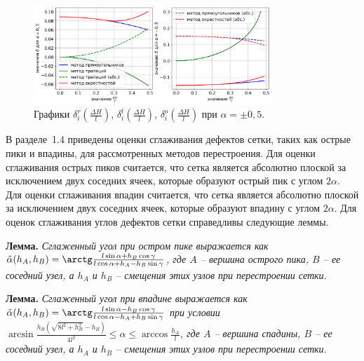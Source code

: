 \documentclass[a4paper,14pt]{extarticle}                     %
\theoremstyle{plain}                                         %
\begin{document}
\begin{figure}[ht]
\centering
\includegraphics[width=0.8\textwidth]{fig/2dr_remesh_fix_alfa_chart_big.png}
\singlespacing
\caption{Графики $\delta_i^r(\frac{\Delta H}{l})$, $\delta_i^t(\frac{\Delta H}{l})$, $\delta_i^o(\frac{\Delta H}{l})$ при $\alpha = \pm 0,5$.}
\label{fig:text_1_remesh_fix_alfa_chart}
\end{figure}


В разделе~1.4 приведены оценки сглаживания дефектов сетки, таких как острые пики и впадины, для рассмотренных методов перестроения.
Для оценки сглаживания острых пиков считается, что сетка является абсолютно плоской за исключением двух соседних ячеек, которые образуют острый пик с углом $2 \alpha$.
Для оценки сглаживания впадин считается, что сетка является абсолютно плоской за исключением двух соседних ячеек, которые образуют впадину с углом $2 \alpha$.
Для оценок сглаживания углов дефектов сетки справедливы следующие леммы.

\textbf{Лемма.} \textit{Сглаженный угол при остром пике выражается как $\hat{\alpha}(h_A, h_B) = \arctg \frac{l \sin \alpha + h_B \cos \gamma}{l \cos \alpha + h_A - h_B \sin \gamma}$, где $A$ -- вершина острого пика, $B$ -- ее соседний узел, а $h_A$ и $h_B$ -- смещения этих узлов при перестроении сетки.}

\textbf{Лемма.} \textit{Сглаженный угол при впадине выражается как $\check{\alpha}(h_A, h_B) = \arctg \frac{l \sin \alpha - h_B \cos \gamma}{l \cos \alpha - h_A + h_B \sin \gamma}$ при условии $\arcsin \frac{h_B ( \sqrt{8 l^2 + h_B^2} - h_B )}{4 l^2} \le \alpha \le \arccos \frac{h_A}{l}$, где $A$ -- вершина спадины, $B$ -- ее соседний узел, а $h_A$ и $h_B$ -- смещения этих узлов при перестроении сетки.}
\end{document}
